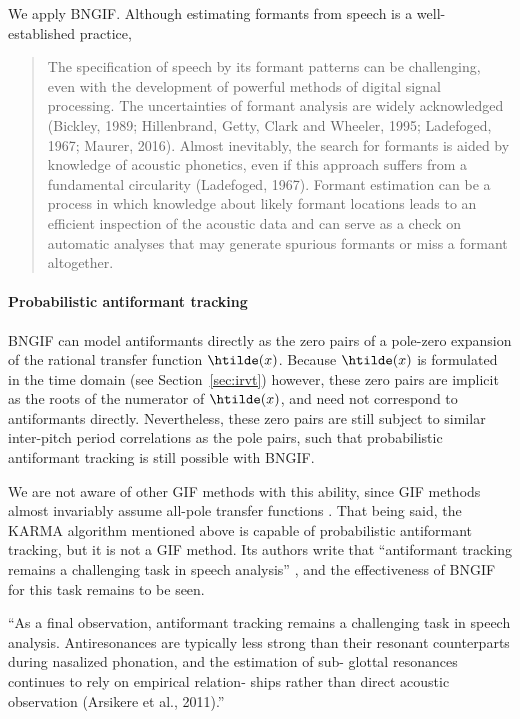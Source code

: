 \begin{chaptersections}{%
We apply BNGIF.
}
Although estimating formants from speech is a well-established practice,

\begin{quote}
	The specification of speech by its formant patterns can be challenging, even
	with the development of powerful methods of digital signal processing. The
	uncertainties of formant analysis are widely acknowledged (Bickley, 1989;
	Hillenbrand, Getty, Clark and Wheeler, 1995; Ladefoged, 1967; Maurer, 2016).
	Almost inevitably, the search for formants is aided by knowledge of acoustic
	phonetics, even if this approach suffers from a fundamental circularity
	(Ladefoged, 1967). Formant estimation can be a process in which knowledge
	about likely formant locations leads to an efficient inspection of the
	acoustic data and can serve as a check on automatic analyses that may
	generate spurious formants or miss a formant altogether. \citep[][p.~75]{Kent2018}
\end{quote}

\paragraph{Probabilistic antiformant tracking}
BNGIF can model antiformants directly as the zero pairs of a pole-zero expansion of the rational transfer function $\htilde(x)$.
Because $\htilde(x)$ is formulated in the time domain (see Section~\ref{sec:irvt}) however, these zero pairs are implicit as the roots of the numerator of $\htilde(x)$, and need not correspond to antiformants directly.
Nevertheless, these zero pairs are still subject to similar inter-pitch period correlations as the pole pairs, such that probabilistic antiformant tracking is still possible with BNGIF.

We are not aware of other GIF methods with this ability, since GIF methods almost invariably assume all-pole transfer functions \citep{Alku2011,Kadiri2021,Bleyer2017}.
That being said, the KARMA \citep{Mehta2012} algorithm mentioned above is capable of probabilistic antiformant tracking, but it is not a GIF method.
Its authors write that ``antiformant tracking remains
a challenging task in speech analysis'' \citep[p.~11]{Mehta2012}, and the effectiveness of BNGIF for this task remains to be seen.

``As a final observation, antiformant tracking remains
a challenging task in speech analysis. Antiresonances
are typically less strong than their resonant counterparts
during nasalized phonation, and the estimation of sub-
glottal resonances continues to rely on empirical relation-
ships rather than direct acoustic observation (Arsikere
et al., 2011).'' \citep[p.~11]{Mehta2012}

\end{chaptersections}